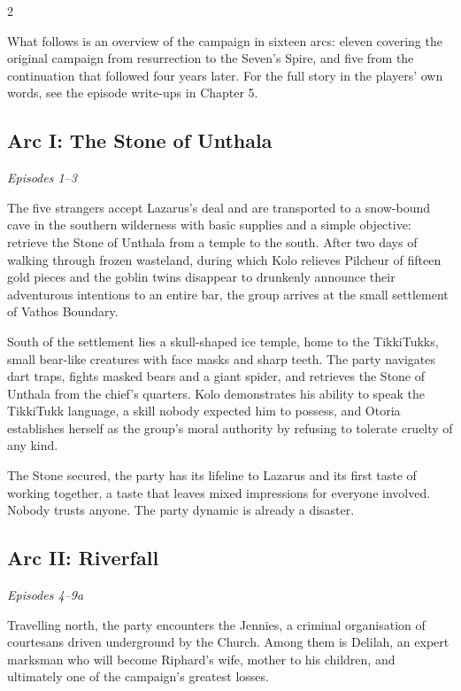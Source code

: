 \begin{multicols}{2}

\noindent
What follows is an overview of the campaign in sixteen arcs: eleven covering the original campaign from resurrection to the Seven's Spire, and five from the continuation that followed four years later.  For the full story in the players' own words, see the episode write-ups in Chapter 5.

\subsection*{Arc I: The Stone of Unthala}
\textit{Episodes 1--3}

\medskip

\noindent
The five strangers accept Lazarus's deal and are transported to a snow-bound cave in the southern wilderness with basic supplies and a simple objective: retrieve the Stone of Unthala from a temple to the south.  After two days of walking through frozen wasteland, during which Kolo relieves Pilcheur of fifteen gold pieces and the goblin twins disappear to drunkenly announce their adventurous intentions to an entire bar, the group arrives at the small settlement of Vathos Boundary.

South of the settlement lies a skull-shaped ice temple, home to the TikkiTukks, small bear-like creatures with face masks and sharp teeth.  The party navigates dart traps, fights masked bears and a giant spider, and retrieves the Stone of Unthala from the chief's quarters.  Kolo demonstrates his ability to speak the TikkiTukk language, a skill nobody expected him to possess, and Otoria establishes herself as the group's moral authority by refusing to tolerate cruelty of any kind.

The Stone secured, the party has its lifeline to Lazarus and its first taste of working together, a taste that leaves mixed impressions for everyone involved.  Nobody trusts anyone.  The party dynamic is already a disaster.

\subsection*{Arc II: Riverfall}
\textit{Episodes 4--9a}

\medskip

\noindent
Travelling north, the party encounters the Jennies, a criminal organisation of courtesans driven underground by the Church.  Among them is Delilah, an expert marksman who will become Riphard's wife, mother to his children, and ultimately one of the campaign's greatest losses.


\end{multicols}

